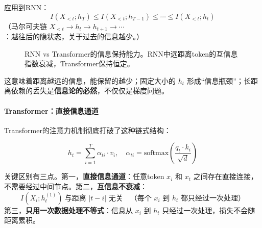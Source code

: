 应用到RNN：
\begin{equation}
    I(X_{<t}; h_{T}) \leq I(X_{<t}; h_{T-1}) \leq \cdots \leq I(X_{<t}; h_t)
\end{equation}
（马尔可夫链 $X_{<t} \to h_t \to h_{t+1} \to \cdots$：越往后的隐状态，关于过去的信息越少。）

\begin{figure}[htbp]
\centering
{}
\caption{RNN vs Transformer的信息保持能力。RNN中远距离token的互信息指数衰减，Transformer保持恒定。}
\end{figure}

这意味着距离越远的信息，能保留的越少；固定大小的 $h_t$ 形成“信息瓶颈”；长距离依赖的丢失是\textbf{信息论的必然}，不仅仅是梯度问题。

\paragraph{Transformer：直接信息通道}

Transformer的注意力机制彻底打破了这种链式结构：

\begin{equation}
    h_t = \sum_{i=1}^{T} \alpha_{ti} \cdot v_i, \quad \alpha_{ti} = \text{softmax}\left(\frac{q_t \cdot k_i}{\sqrt{d}}\right)
\end{equation}

关键区别有三点。第一，\textbf{直接信息通道}：任意token $x_i$ 和 $x_t$ 之间存在直接连接，不需要经过中间节点。第二，\textbf{互信息不衰减}：
\begin{equation}
    I(X_i; h_t^{(1)}) \ \text{与距离 $|t-i|$ 无关} \quad \text{（每个 $x_i$ 到 $h_t$ 都只经过一次处理）}
\end{equation}
第三，\textbf{只用一次数据处理不等式}：信息从 $x_i$ 到 $h_t$ 只经过一次处理，损失不会随距离累积。

